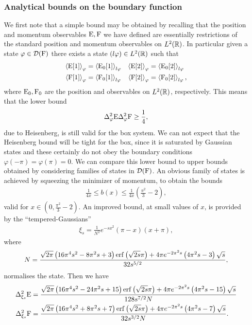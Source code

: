 \subsubsection{Analytical bounds on the boundary function}
\label{subsubsec:box-ur-analytical-bounds}
We first note that a simple bound may be obtained by recalling that the position and momentum observables $\operatorname{E},\operatorname{F}$ we have defined are essentially restrictions of the standard position and momentum observables on $L^2(\mathbb{R})$. In particular given a state $\varphi\in\mathcal{D}(\operatorname{F})$ there exists a state $(l\varphi)\in L^2(\mathbb{R})$ such that
\begin{align}
  \left\langle{\operatorname{E}[1]}\right\rangle_{\varphi} &= \left\langle{\operatorname{E}_0[1]}\right\rangle_{l\varphi} & \left\langle{\operatorname{E}[2]}\right\rangle_{\varphi} &= \left\langle{\operatorname{E}_0[2]}\right\rangle_{l\varphi}\\
  \left\langle{\operatorname{F}[1]}\right\rangle_{\varphi} &= \left\langle{\operatorname{F}_0[1]}\right\rangle_{l\varphi} & \left\langle{\operatorname{F}[2]}\right\rangle_{\varphi} &= \left\langle{\operatorname{F}_0[2]}\right\rangle_{l\varphi},
\end{align}
where $\operatorname{E}_0, \operatorname{F}_0$ are the position and observables on $L^2(\mathbb{R})$, respectively. This means that the lower bound
\begin{align}
  \var[\varphi]{\ope}\var[\varphi]{\opf} \geq \frac{1}{4},
\end{align}
due to Heisenberg, is still valid for the box system. We can not expect that the Heisenberg bound will be tight for the box, since it is saturated by Gaussian states and these certainly do not obey the boundary conditions $\varphi(-\pi) = \varphi(\pi) = 0$. We can compare this lower bound to upper bounds obtained by considering families of states in $\mathcal{D}(\operatorname{F})$. An obvious family of states is achieved by squeezing the minimizer of momentum, to obtain the bounds
\begin{align}
  \frac{1}{4x}\leq b(x) \leq \frac{1}{4x}\left(\frac{\pi^2}{3}-2\right),
\end{align}
valid for $x\in\left(0, \frac{\pi^2}{3}-2\right)$. An improved bound, at small values of $x$, is provided by the ``tempered-Gaussians''
\begin{align}
  \xi_s = \frac{1}{N^2} e^{-s x^2} (\pi-x)(x+\pi),
\end{align}
where
\begin{align}
  N = \frac{\sqrt{2 \pi } \left(16 \pi^4 s^2-8 \pi^2 s+3\right) \operatorname{erf}\left(\sqrt{2s} \pi \right)+4 \pi  e^{-2 \pi ^2 s} \left(4 \pi ^2 s-3\right) \sqrt{s}}{32 s^{5/2}},
\end{align}
normalises the state. Then we have
\begin{align}
  \var[\xi_s]{\ope} &= \frac{\sqrt{2 \pi } \left(16 \pi ^4 s^2-24 \pi ^2 s+15\right) \erf\left(\sqrt{2s} \pi\right)+4 \pi  e^{-2 \pi ^2 s} \left(4 \pi ^2 s-15\right) \sqrt{s}}{128 s^{7/2}N}\\
  \var[\xi_s]{\opf} &= \frac{\sqrt{2 \pi } \left(16 \pi ^4 s^2+8 \pi ^2 s+7\right) \erf\left(\sqrt{2s} \pi\right)+4 \pi  e^{-2 \pi ^2 s} \left(4 \pi ^2 s-7\right) \sqrt{s}}{32 s^{3/2}N }.
\end{align}
